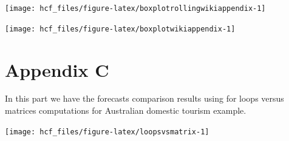 \documentclass[11pt,a4paper,]{article}
\let\origfigure\figure
\let\endorigfigure\endfigure
\renewenvironment{figure}[1][2] {
    \expandafter\origfigure\expandafter[!htbp]
} {
    \endorigfigure
}
\begin{document}
\begin{figure}

{\centering \texttt{[image: hcf\_files/figure-latex/boxplotrollingwikiappendix-1]} 

}

\caption{Box plots of scaled forecast errors from reconciled and unreconciled ETS, ARIMA and OLS methods at each hierarchical level for 1-step-ahead Wikipedia pageviews.}\label{fig:boxplotrollingwikiappendix}
\end{figure}

\begin{figure}

{\centering \texttt{[image: hcf\_files/figure-latex/boxplotwikiappendix-1]} 

}

\caption{Box plots of scaled forecast errors from reconciled and unreconciled ETS, ARIMA and OLS method at each hierarchical level for 28-step-ahead Wikipedia pageviews.}\label{fig:boxplotwikiappendix}
\end{figure}

\clearpage

\hypertarget{appendixC}{%
\section*{Appendix C}\label{appendixC}}

In this part we have the forecasts comparison results using for loops versus matrices computations for Australian domestic tourism example.

\begin{figure}

{\centering \texttt{[image: hcf\_files/figure-latex/loopsvsmatrix-1]} 

}

\caption{Comparison of the computation times for using matrix and `for' loops to reconcile forecasts for 1-step-ahead and 24-step-ahead tourism demand - bottom level series.}\label{fig:loopsvsmatrix}
\end{figure}

\clearpage

\printbibliography
\end{document}
